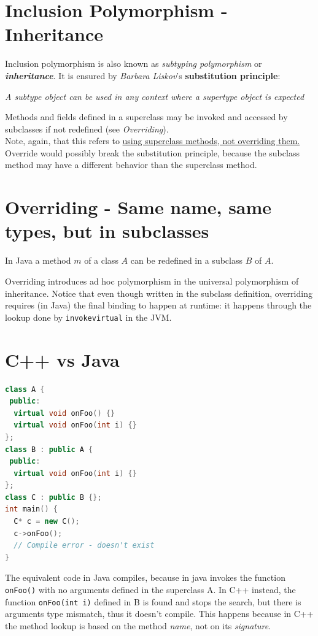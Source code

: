 \section{Inclusion Polymorphism - Inheritance}
Inclusion polymorphism is also known as \textit{subtyping polymorphism} or \textit{\textbf{inheritance}}.
It is ensured by \textit{Barbara Liskov}'s \textbf{substitution principle}:
\begin{definition}
    \textit{A subtype object can be used in any context where a supertype object is expected}
\end{definition}
Methods and fields defined in a superclass may be invoked and accessed by subclasses if not redefined (see \textit{Overriding}).\\
Note, again, that this refers to \ul{using superclass methods, not overriding them.}\\
Override would possibly break the substitution principle, because the subclass method may have a different behavior than the superclass method.

\section{Overriding - Same name, same types, but in subclasses}
In Java a method $m$ of a
class $A$ can be redefined
in a subclass $B$ of $A$.

Overriding introduces ad hoc polymorphism in the universal polymorphism of inheritance.
Notice that even though written in the subclass definition, overriding requires (in Java) the final binding to happen at runtime:
it happens through the lookup done by \lstinline{invokevirtual} in the JVM.

\section{C++ vs Java}
\begin{lstlisting}[language=C++]
class A {
 public:
  virtual void onFoo() {}
  virtual void onFoo(int i) {}
};
class B : public A {
 public:
  virtual void onFoo(int i) {}
};
class C : public B {};
int main() {
  C* c = new C();
  c->onFoo();
  // Compile error - doesn't exist
}
\end{lstlisting}
The equivalent code in Java compiles, because in java invokes the function \lstinline{onFoo()} with no arguments defined in the superclass A.
In C++ instead, the function \lstinline|onFoo(int i)| defined in B is found and stops the search, but there is arguments type mismatch, thus it doesn't compile.
This happens because in C++ the method lookup is based on the method \textit{name}, not on its \textit{signature}.

